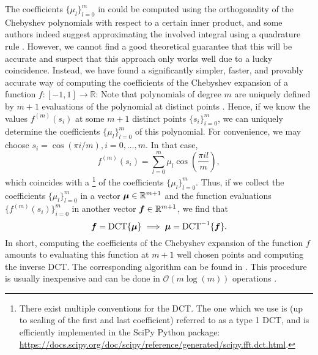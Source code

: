 The coefficients $\{\mu_l\}_{l=0}^{m}$ in 
could be computed using the orthogonality of the Chebyshev polynomials with respect
to a certain inner product, and some authors indeed suggest approximating the
involved integral using a quadrature rule \cite[equation~8, algorithm~1]{lin2017randomized}.
However, we cannot find a good theoretical guarantee that this will be accurate
and suspect that this approach only works well due to a lucky coincidence.
Instead, we
have found a significantly simpler, faster, and provably accurate way of
computing the coefficients of the Chebyshev expansion of a function $f:[-1,1] \to \mathbb{R}$:
Note that polynomials of degree $m$ are uniquely defined by $m+1$
evaluations of the polynomial at distinct points \cite{gauss1799demonstratio}.
Hence, if we know the values $f^{(m)}(s_i)$ at some $m+1$ distinct points 
$\{s_i\}_{i=0}^m$, we can uniquely determine the coefficients $\{\mu_l\}_{l=0}^{m}$
of this polynomial. For convenience, we may choose $s_i = \cos(\pi i/m), i=0,\dots,m$.
In that case,
\begin{equation}
    f^{(m)}(s_i) = \sum_{l=0}^{m} \mu_l \cos\left(\frac{\pi i l}{m}\right),
    \label{equ:2-chebyshev-chebyshev-nodes-evaluation}
\end{equation}
which coincides with a \footnote{There exist multiple conventions for the DCT.
The one which we use is (up to scaling of the first and last coefficient)
referred to as a type 1 DCT, and is efficiently implemented in the SciPy Python package:
\url{https://docs.scipy.org/doc/scipy/reference/generated/scipy.fft.dct.html}.} of the coefficients $\{\mu_l\}_{l=0}^{m}$.
Thus, if we collect the coefficients $\{\mu_l\}_{l=0}^{m}$ in a vector $\boldsymbol{\mu} \in \mathbb{R}^{m+1}$ 
and the function evaluations $\{f^{(m)}(s_i)\}_{i=0}^{m}$ in another
vector $\boldsymbol{f} \in \mathbb{R}^{m+1}$, we find that
\begin{equation}
    \boldsymbol{f} = \operatorname{DCT} \{ \boldsymbol{\mu} \} \implies \boldsymbol{\mu} = \operatorname{DCT}^{-1}\{ \boldsymbol{f} \}.
    \label{equ:2-chebyshev-chebyshev-DCT}
\end{equation}
In short, computing the coefficients of the Chebyshev expansion 
of the function $f$ amounts to evaluating this function at $m+1$ well
chosen points and computing the inverse \gls{DCT}. The corresponding algorithm
can be found in .
This procedure is usually inexpensive and can be done in $\mathcal{O}(m \log(m))$
operations \cite{makhoul1980fct}.

